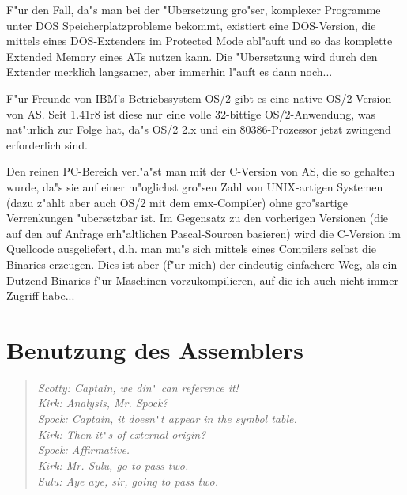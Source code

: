 \documentclass[12pt,a4paper,twoside]{report}
\newcommand{\asname}{AS}
\begin{document}
F"ur den Fall, da"s  man bei der "Ubersetzung
gro"ser, komplexer Programme unter DOS Speicherplatzprobleme bekommt,
existiert eine DOS-Version, die mittels eines DOS-Extenders im Protected
Mode abl"auft und so das komplette Extended Memory eines ATs nutzen kann.
Die "Ubersetzung wird durch den Extender merklich langsamer, aber immerhin
l"auft es dann noch...

F"ur Freunde von IBM's Betriebssystem OS/2  gibt es
eine native OS/2-Version von \asname{}.  Seit 1.41r8 ist diese nur eine volle
32-bittige OS/2-Anwendung, was nat"urlich zur Folge hat, da"s OS/2 2.x
und ein 80386-Prozessor jetzt zwingend erforderlich sind.

Den reinen PC-Bereich verl"a"st man mit der 
C-Version von \asname{}, die so gehalten wurde, da"s sie auf einer m"oglichst
gro"sen Zahl von UNIX-artigen Systemen (dazu z"ahlt aber auch OS/2 mit dem
emx-Compiler) ohne gro"sartige Verrenkungen "ubersetzbar ist.  Im
Gegensatz zu den vorherigen Versionen (die auf den auf Anfrage
erh"altlichen Pascal-Sourcen basieren) wird die C-Version im Quellcode
ausgeliefert, d.h. man mu"s sich mittels eines Compilers selbst die
Binaries erzeugen.  Dies ist aber (f"ur mich) der eindeutig einfachere
Weg, als ein Dutzend Binaries f"ur Maschinen vorzukompilieren, auf die ich
auch nicht immer Zugriff habe...


\cleardoublepage
\chapter{Benutzung des Assemblers}

\begin{quote}\begin{raggedright}{\it
Scotty: Captain, we din\verb!'! can reference it! \\
Kirk:   Analysis, Mr. Spock? \\
Spock:  Captain, it doesn\verb!'!t appear in the symbol table. \\
Kirk:   Then it\verb!'!s of external origin? \\
Spock:  Affirmative. \\
Kirk:   Mr. Sulu, go to pass two. \\
Sulu:   Aye aye, sir, going to pass two. \\
}\end{raggedright}\end{quote}
\end{document}
